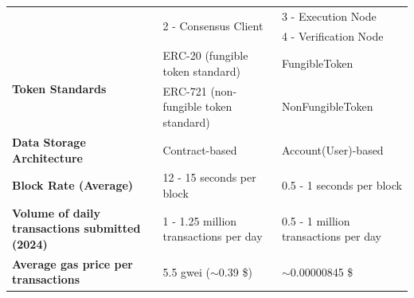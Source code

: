 \documentclass[../main.tex]{subfiles}
\begin{document}
\begin{table}[h]
\begin{adjustwidth}{-1.5cm}{}
\begin{tabular}{@{} m{4cm} ll@{}}
                                                                    & \multicolumn{1}{l}{\multirow{2}{*}{2 - Consensus Client}}           & 3 - Execution Node                   \\ \cmidrule(l){3-3}
                                                                    & \multicolumn{1}{l}{}                                                & 4 - Verification Node                \\ \midrule
            \multirow{2}{*}{\textbf{Token Standards}}               & \multicolumn{1}{l}{ERC-20 (fungible token standard)}                & FungibleToken                        \\ \cmidrule(l){2-3}
                                                                    & \multicolumn{1}{l}{ERC-721 (non-fungible token standard)}           & NonFungibleToken                     \\ \midrule
            \textbf{Data Storage Architecture}                      & \multicolumn{1}{l}{Contract-based}                                  & Account(User)-based                  \\ \midrule
            \textbf{Block Rate (Average)}                           & \multicolumn{1}{l}{12 - 15 seconds per block}                       & 0.5 - 1 seconds per block            \\ \midrule
            \textbf{Volume of daily transactions submitted (2024)}  & \multicolumn{1}{l}{1 - 1.25 million transactions per day}           & 0.5 - 1 million transactions per day \\ \midrule
            \textbf{Average gas price per transactions}             & \multicolumn{1}{l}{5.5 gwei ($\sim$0.39 \$)}                        & $\sim$0.00000845 \$                  \\ \bottomrule
        \end{tabular}
    \end{adjustwidth}
    \label{tab:ethereum_flow_comparison_table}
\end{table}
\end{document}
